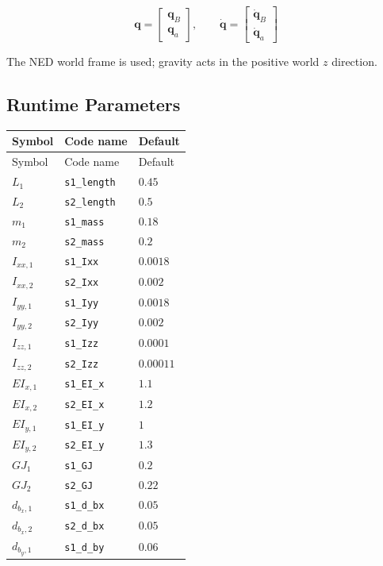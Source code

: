 \documentclass[11pt]{article}
\begin{document}
\begin{equation}
\boldsymbol q=\begin{bmatrix}\boldsymbol q_B\\\boldsymbol q_a\end{bmatrix},\qquad \dot{\boldsymbol q}=\begin{bmatrix}\dot{\boldsymbol q}_B\\\dot{\boldsymbol q}_a\end{bmatrix}
\end{equation}

The NED world frame is used; gravity acts in the positive world $z$ direction.
\subsection{Runtime Parameters}
\begin{longtable}{lll}
\hline
Symbol & Code name & Default \\
\hline
\endfirsthead
\hline Symbol & Code name & Default \\
\hline
\endhead
$L_{1}$ & \texttt{s1\_length} & $0.45$ \\
$L_{2}$ & \texttt{s2\_length} & $0.5$ \\
$m_{1}$ & \texttt{s1\_mass} & $0.18$ \\
$m_{2}$ & \texttt{s2\_mass} & $0.2$ \\
$I_{xx,1}$ & \texttt{s1\_Ixx} & $0.0018$ \\
$I_{xx,2}$ & \texttt{s2\_Ixx} & $0.002$ \\
$I_{yy,1}$ & \texttt{s1\_Iyy} & $0.0018$ \\
$I_{yy,2}$ & \texttt{s2\_Iyy} & $0.002$ \\
$I_{zz,1}$ & \texttt{s1\_Izz} & $0.0001$ \\
$I_{zz,2}$ & \texttt{s2\_Izz} & $0.00011$ \\
$EI_{x,1}$ & \texttt{s1\_EI\_x} & $1.1$ \\
$EI_{x,2}$ & \texttt{s2\_EI\_x} & $1.2$ \\
$EI_{y,1}$ & \texttt{s1\_EI\_y} & $1$ \\
$EI_{y,2}$ & \texttt{s2\_EI\_y} & $1.3$ \\
$GJ_{1}$ & \texttt{s1\_GJ} & $0.2$ \\
$GJ_{2}$ & \texttt{s2\_GJ} & $0.22$ \\
$d_{b_x,1}$ & \texttt{s1\_d\_bx} & $0.05$ \\
$d_{b_x,2}$ & \texttt{s2\_d\_bx} & $0.05$ \\
$d_{b_y,1}$ & \texttt{s1\_d\_by} & $0.06$ \\

\end{longtable}
\end{document}
